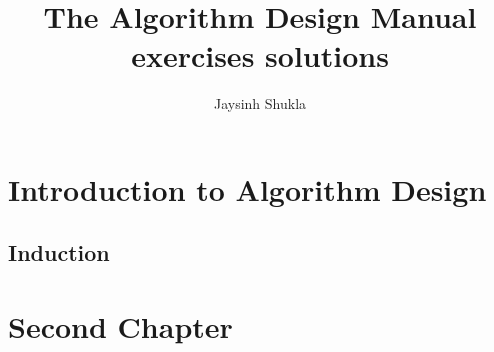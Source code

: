 \documentclass{book}
\title{The Algorithm Design Manual exercises solutions}
\author{Jaysinh Shukla}
\begin{document}
  \maketitle
  \mainmatter
  \chapter{Introduction to Algorithm Design}
    \section{Induction}
      
  \chapter{Second Chapter}
\end{document}
